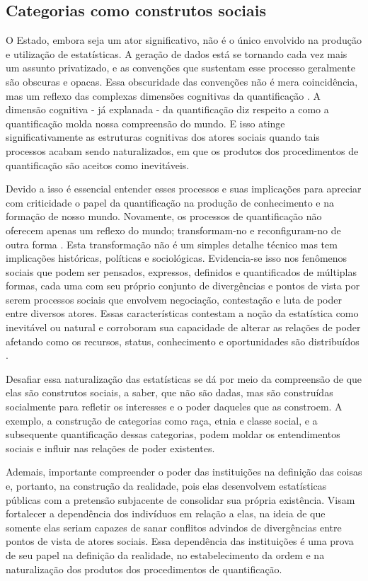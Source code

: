 \subsection{Categorias como construtos sociais}

O Estado, embora seja um ator significativo, não é o único envolvido na produção e utilização de estatísticas. A geração de dados está se tornando cada vez mais um assunto privatizado, e as convenções que sustentam esse processo geralmente são obscuras e opacas. Essa obscuridade das convenções não é mera coincidência, mas um reflexo das complexas dimensões cognitivas da quantificação \cite{desrosieres1988categories}. A dimensão cognitiva - já explanada - da quantificação diz respeito a como a quantificação molda nossa compreensão do mundo. E isso atinge significativamente as estruturas cognitivas dos atores sociais quando tais processos acabam sendo naturalizados, em que os produtos dos procedimentos de quantificação são aceitos como inevitáveis.

Devido a isso é essencial entender esses processos e suas implicações para apreciar com criticidade o papel da quantificação na produção de conhecimento e na formação de nosso mundo. Novamente, os processos de quantificação não oferecem apenas um reflexo do mundo; transformam-no e reconfiguram-no de outra forma \cite{camargo2021estudos}. Esta transformação não é um simples detalhe técnico mas tem implicações históricas, políticas e sociológicas. Evidencia-se isso nos fenômenos sociais que podem ser pensados, expressos, definidos e quantificados de múltiplas formas, cada uma com seu próprio conjunto de divergências e pontos de vista por serem processos sociais que envolvem negociação, contestação e luta de poder entre diversos atores. Essas características contestam a noção da estatística como inevitável ou natural e corroboram sua capacidade de alterar as relações de poder afetando como os recursos, status, conhecimento e oportunidades são distribuídos \cite{didier2021estatativismo}.

Desafiar essa naturalização das estatísticas se dá por meio da compreensão de que elas são construtos sociais, a saber, que não são dadas, mas são construídas socialmente para refletir os interesses e o poder daqueles que as constroem. A exemplo, a construção de categorias como raça, etnia e classe social, e a subsequente quantificação dessas categorias, podem moldar os entendimentos sociais e influir nas relações de poder existentes.

Ademais, importante compreender o poder das instituições na definição das coisas e, portanto, na construção da realidade, pois elas desenvolvem estatísticas públicas com a pretensão subjacente de consolidar sua própria existência. Visam fortalecer a dependência dos indivíduos em relação a elas, na ideia de que somente elas seriam capazes de sanar conflitos advindos de divergências entre pontos de vista de atores sociais. Essa dependência das instituições é uma prova de seu papel na definição da realidade, no estabelecimento da ordem e na naturalização dos produtos dos procedimentos de quantificação.

